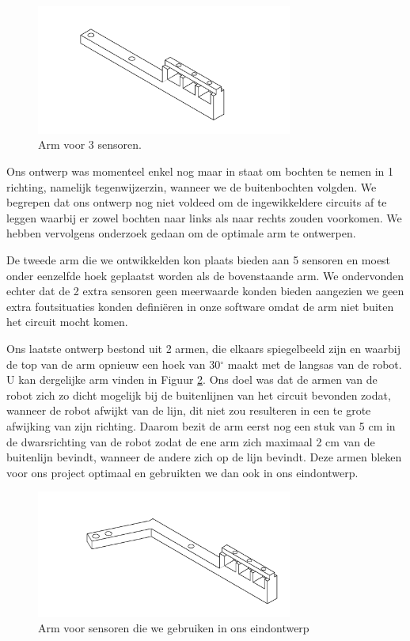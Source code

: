 \begin{figure}[H]
\centering
\includegraphics[width=0.75\textwidth]{3sensoren.png}
\caption{Arm voor 3 sensoren. \label{fig:3sensoren}}
\end{figure}


Ons ontwerp was momenteel enkel nog maar in staat om bochten te nemen in 1 richting, namelijk tegenwijzerzin, wanneer we de buitenbochten volgden. We begrepen dat ons ontwerp nog niet voldeed om de ingewikkeldere circuits af te leggen waarbij er zowel bochten naar links als naar rechts zouden voorkomen. We hebben vervolgens onderzoek gedaan om de optimale arm te ontwerpen.

De tweede arm die we ontwikkelden kon plaats bieden aan 5 sensoren en moest onder eenzelfde hoek geplaatst worden als de bovenstaande arm. We ondervonden echter dat de 2 extra sensoren geen meerwaarde konden bieden aangezien we geen extra foutsituaties konden defini\"eren in onze software omdat de arm niet buiten het circuit mocht komen. 

Ons laatste ontwerp bestond uit 2 armen, die elkaars spiegelbeeld zijn en waarbij de top van de arm opnieuw een hoek van 30$^\circ$ maakt met de langsas van de robot. U kan dergelijke arm vinden in Figuur \ref{fig:schuinnaarvoor}. Ons doel was dat de armen van de robot zich zo dicht mogelijk bij de buitenlijnen van het circuit bevonden zodat, wanneer de robot afwijkt van de lijn, dit niet zou resulteren in een te grote afwijking van zijn richting. Daarom bezit de arm eerst nog een stuk van 5 cm in de dwarsrichting van de robot zodat de ene arm zich maximaal 2 cm van de buitenlijn bevindt, wanneer de andere zich op de lijn bevindt. Deze armen bleken voor ons project optimaal en gebruikten we dan ook in ons eindontwerp.

\begin{figure}[H]
\centering
\includegraphics[width=0.75\textwidth]{schuinnaarvoor.png}
\caption{Arm voor sensoren die we gebruiken in ons eindontwerp \label{fig:schuinnaarvoor}}
\end{figure}

